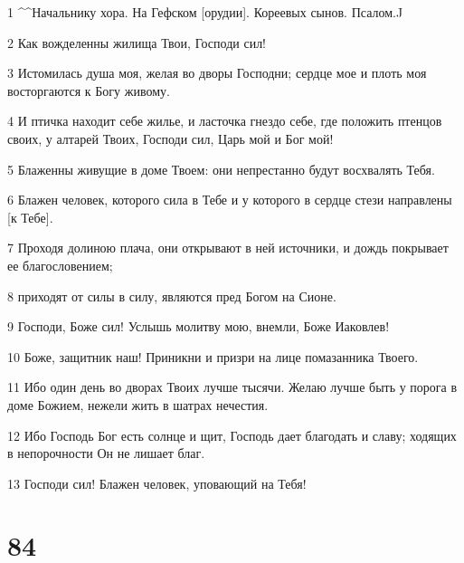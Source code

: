 \par 1 ^^Начальнику хора. На Гефском [орудии]. Кореевых сынов. Псалом.^^
\par 2 Как вожделенны жилища Твои, Господи сил!
\par 3 Истомилась душа моя, желая во дворы Господни; сердце мое и плоть моя восторгаются к Богу живому.
\par 4 И птичка находит себе жилье, и ласточка гнездо себе, где положить птенцов своих, у алтарей Твоих, Господи сил, Царь мой и Бог мой!
\par 5 Блаженны живущие в доме Твоем: они непрестанно будут восхвалять Тебя.
\par 6 Блажен человек, которого сила в Тебе и у которого в сердце стези направлены [к Тебе].
\par 7 Проходя долиною плача, они открывают в ней источники, и дождь покрывает ее благословением;
\par 8 приходят от силы в силу, являются пред Богом на Сионе.
\par 9 Господи, Боже сил! Услышь молитву мою, внемли, Боже Иаковлев!
\par 10 Боже, защитник наш! Приникни и призри на лице помазанника Твоего.
\par 11 Ибо один день во дворах Твоих лучше тысячи. Желаю лучше быть у порога в доме Божием, нежели жить в шатрах нечестия.
\par 12 Ибо Господь Бог есть солнце и щит, Господь дает благодать и славу; ходящих в непорочности Он не лишает благ.
\par 13 Господи сил! Блажен человек, уповающий на Тебя!

\chapter{84}

